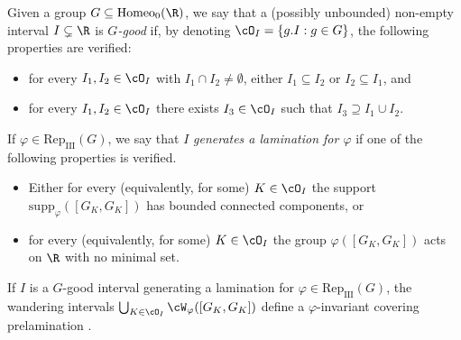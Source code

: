 \documentclass[reqno]{amsart}
\begin{document}
\begin{defn}
Given a group $G \subseteq \mathrm{Homeo}_0(\R)$, we say that a (possibly unbounded) non-empty interval $I \subsetneq \R$ is \emph{$G$-good} if, by denoting $\cO_I = \{g.I : g \in G\}$, the following properties are verified:
\begin{itemize}
	\item for every $I_1, I_2 \in \cO_I$ with $I_1 \cap I_2 \neq \emptyset$, either $I_1 \subseteq I_2$ or $I_2 \subseteq I_1$, and
	\item for every $I_1, I_2 \in \cO_I$ there exists $I_3 \in \cO_I$ such that $I_3 \supseteq I_1 \cup I_2$.
\end{itemize}
If $\varphi \in \mathrm{Rep}_\mathrm{III}(G)$, we say that $I$ \emph{generates a lamination for $\varphi$} if one of the following properties is verified.
\begin{itemize}
	\item Either for every (equivalently, for some) $K \in \cO_I$ the support $\mathrm{supp}_\varphi([G_K, G_K])$ has bounded connected components, or
	\item for every (equivalently, for some) $K \in \cO_I$ the group $\varphi([G_K, G_K])$ acts on $\R$ with no minimal set.
\end{itemize}
\end{defn}

If $I$ is a $G$-good interval generating a lamination for $\varphi \in \mathrm{Rep}_\mathrm{III}(G)$, the wandering intervals $\bigcup_{K \in \cO_I} \cW_\varphi([G_K, G_K])$ define a $\varphi$-invariant covering prelamination \cite[Proposition 8.3.4]{BMRT}.
\end{document}
